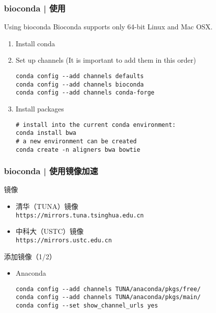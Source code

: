 \begin{frame}[fragile]
  \frametitle{bioconda | 使用}
  \begin{block}{Using bioconda}
    Bioconda supports only 64-bit Linux and Mac OSX.
    \begin{enumerate}
      \item Install conda
      \item Set up channels (It is important to add them in this order)
\vspace{-0.5em}
\begin{lstlisting}
conda config --add channels defaults
conda config --add channels bioconda
conda config --add channels conda-forge
\end{lstlisting}
\vspace{-0.8em}
      \item Install packages
\vspace{-0.5em}
\begin{lstlisting}
# install into the current conda environment:
conda install bwa
# a new environment can be created
conda create -n aligners bwa bowtie
\end{lstlisting}
    \end{enumerate}
  \end{block}
\end{frame}

\begin{frame}[fragile]
  \frametitle{bioconda | 使用镜像加速}
  \begin{block}{镜像}
    \begin{itemize}
      \item 清华（TUNA）镜像\\ \verb|https://mirrors.tuna.tsinghua.edu.cn|
      \item 中科大（USTC）镜像\\ \verb|https://mirrors.ustc.edu.cn|
    \end{itemize}
  \end{block}
  \pause
  \begin{block}{添加镜像（1/2）}
    \begin{itemize}
      \item Anaconda
\begin{lstlisting}
conda config --add channels TUNA/anaconda/pkgs/free/
conda config --add channels TUNA/anaconda/pkgs/main/
conda config --set show_channel_urls yes
\end{lstlisting}
    \end{itemize}
  \end{block}
\end{frame}


